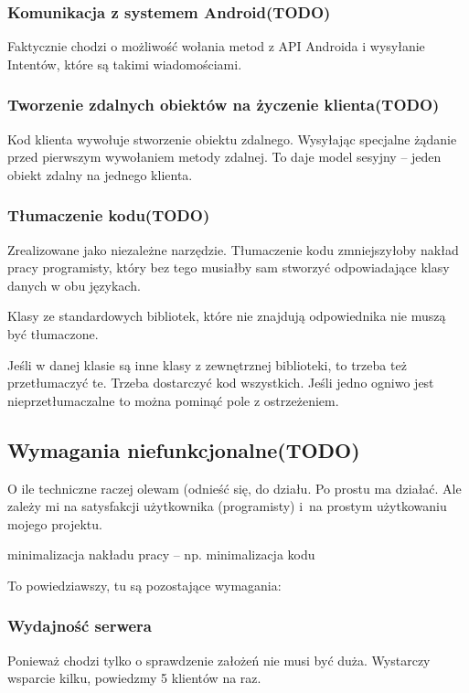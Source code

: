 \subsubsection{Komunikacja z systemem Android(TODO)}
Faktycznie chodzi o możliwość wołania metod z API Androida i wysyłanie Intentów, które są takimi wiadomościami.

\subsubsection{Tworzenie zdalnych obiektów na życzenie klienta(TODO)}
Kod klienta wywołuje stworzenie obiektu zdalnego. Wysyłając specjalne żądanie przed pierwszym wywołaniem metody zdalnej. To daje model sesyjny -- jeden obiekt zdalny na jednego klienta.

\subsubsection{Tłumaczenie kodu(TODO)}
Zrealizowane jako niezależne narzędzie.
Tłumaczenie kodu zmniejszyłoby nakład pracy programisty, który bez tego musiałby sam stworzyć odpowiadające klasy danych w obu językach.

Klasy ze standardowych bibliotek, które nie znajdują odpowiednika nie muszą być tłumaczone.

Jeśli w danej klasie są inne klasy z zewnętrznej biblioteki, to trzeba też przetłumaczyć te. Trzeba dostarczyć kod wszystkich.
Jeśli jedno ogniwo jest nieprzetłumaczalne to można pominąć pole z ostrzeżeniem.



\subsection{Wymagania niefunkcjonalne(TODO)}
O ile techniczne raczej olewam (odnieść się, do działu. Po prostu ma działać.
Ale zależy mi na satysfakcji użytkownika (programisty) i~na prostym użytkowaniu mojego projektu.

minimalizacja nakładu pracy -- np. minimalizacja kodu

To powiedziawszy, tu są pozostające wymagania:

\subsubsection{Wydajność serwera}
Ponieważ chodzi tylko o sprawdzenie założeń nie musi być duża. Wystarczy wsparcie kilku, powiedzmy 5 klientów na raz.

